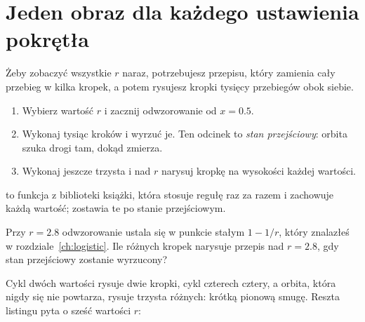 \begin{outcomes}
\end{outcomes}

\section{Jeden obraz dla każdego ustawienia pokrętła}
\label{sec:ch08-picture}

\noindent
Żeby zobaczyć wszystkie $r$ naraz, potrzebujesz przepisu, który zamienia
cały przebieg w kilka kropek, a potem rysujesz kropki tysięcy przebiegów
obok siebie.

\begin{enumerate}
\item Wybierz wartość $r$ i zacznij odwzorowanie od $x = \num{0.5}$.
\item Wykonaj tysiąc kroków i wyrzuć je. Ten odcinek to \emph{stan
  przejściowy}: orbita szuka drogi tam, dokąd zmierza.
\item Wykonaj jeszcze trzysta i nad $r$ narysuj kropkę na wysokości każdej
  wartości.
\end{enumerate}


\noindent
{} to funkcja z biblioteki książki, która stosuje regułę raz za
razem i zachowuje każdą wartość;  zostawia te po stanie
przejściowym.

\begin{think}
Przy $r = \num{2.8}$ odwzorowanie ustala się w punkcie stałym $1 - 1/r$,
który znalazłeś w rozdziale~\ref{ch:logistic}. Ile różnych kropek narysuje
przepis nad $r = \num{2.8}$, gdy stan przejściowy zostanie wyrzucony?
\end{think}
Cykl dwóch wartości rysuje dwie kropki, cykl czterech \dash{} cztery, a
orbita, która nigdy się nie powtarza, rysuje trzysta różnych: krótką pionową
smugę. Reszta listingu pyta o sześć wartości $r$:

